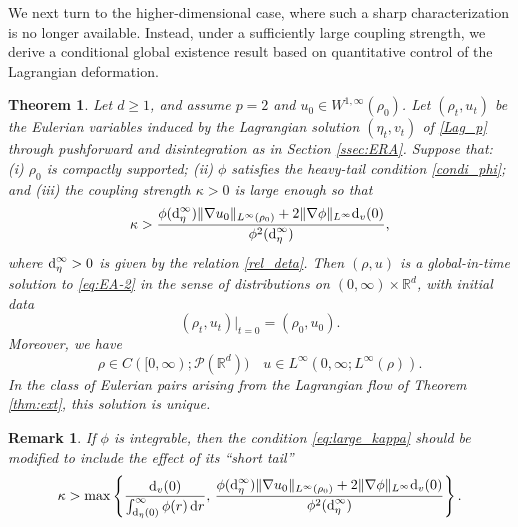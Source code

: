 \documentclass[10pt,reqno]{amsart}
\renewcommand{\geq}{\geqslant}
\numberwithin{equation}{section}
\newtheorem{theorem}{Theorem}[section]
\newtheorem{remark}{Remark}[section]
\newcommand{\R}{\mathbb R}
\newcommand{\lt}{\left}
\newcommand{\rt}{\right}
\newcommand{\calP}{\mathcal P}
\newcommand{\rd}{\textnormal{d}}
\newcommand{\dr}{\textnormal{d}r}
\begin{document}
We next turn to the higher-dimensional case, where such a sharp characterization is no longer available. Instead, under a sufficiently large coupling strength, we derive a conditional global existence result based on quantitative control of the Lagrangian deformation.
 
 \begin{theorem} \label{thm:EA_global}
Let $d \geq 1$, and assume $p=2$ and $u_0 \in W^{1,\infty}(\rho_0)$. Let $(\rho_t, u_t)$ be the Eulerian variables induced by the Lagrangian solution $(\eta_t,v_t)$ of \eqref{Lag_p} through pushforward and disintegration as in Section \ref{ssec:ERA}. Suppose that:\newline
(i)   $\rho_0$ is compactly supported;\newline
(ii) $\phi$ satisfies the heavy-tail condition \eqref{condi_phi}; and\newline
(iii)  the coupling strength $\kappa > 0$ is large enough so that
 \begin{equation}\label{eq:large_kappa}
 \kappa >  \frac{\phi(\rd_\eta^\infty)\|\nabla u_0\|_{L^\infty(\rho_0)} + 2\|\nabla\phi\|_{L^\infty} \rd_v(0) }{\phi^2(\rd_\eta^\infty)},
 \end{equation}
where $\rd_\eta^\infty > 0$ is given by the relation \eqref{rel_deta}.\newline
 Then  $(\rho, u)$ is a global-in-time solution to \eqref{eq:EA-2} in the sense of distributions on $(0,\infty)\times\R^d$, with initial data 
\[
(\rho_t, u_t)|_{t=0} = (\rho_0, u_0).
\]
Moreover, we have
\[
\rho \in C([0,\infty);\calP(\R^d))  \quad u \in L^\infty(0,\infty; L^\infty(\rho)).
\]
In the class of Eulerian pairs arising from the Lagrangian flow of Theorem \ref{thm:ext}, this solution is unique.
\end{theorem}

\begin{remark}
If $\phi$ is integrable, then the condition \eqref{eq:large_kappa} should be modified to include  the effect of its ``short tail''
\[
\kappa > \max\lt\{\frac{\rd_v(0)}{\int_{\rd_\eta(0)}^\infty \phi(r)\,\dr}, \, \frac{\phi(\rd_\eta^\infty)\|\nabla u_0\|_{L^\infty(\rho_0)} + 2\|\nabla\phi\|_{L^\infty} \rd_v(0) }{\phi^2(\rd_\eta^\infty)} \rt\}.
\]
\end{remark}
\end{document}

